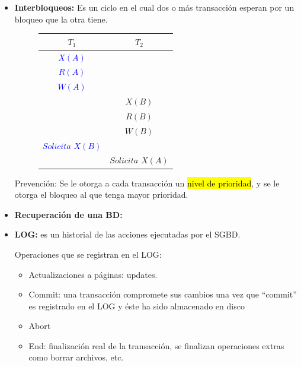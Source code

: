 \documentclass{templateNote}
\begin{document}
\begin{itemize}
    \item \textbf{Interbloqueos:} Es un ciclo en el cual dos o más transacción esperan por un bloqueo que la otra tiene.
    
    \begin{figure}[H]
        \centering
        \begin{tabular}{|c|c|}
            \hline
            \textbf{$T_1$} & \textbf{$T_2$} \\ \hline
            \textcolor{blue}{$X(A)$} & \\
            \textcolor{blue}{$R(A)$} & \\
            \textcolor{blue}{$W(A)$} & \\
            & \textcolor{green!80!black}{$X(B)$} \\
            & \textcolor{green!80!black}{$R(B)$} \\
            & \textcolor{green!80!black}{$W(B)$} \\
            \textcolor{blue}{\textit{$Solicita$  ${X(B)}$}} & \\
            & \textcolor{green!80!black}{\textit{$Solicita$ ${X(A)}$}} \\ \hline
        \end{tabular}
    \end{figure}

    Prevención: Se le otorga a cada transacción un \hl{nivel de prioridad}, y se le otorga el bloqueo al que tenga mayor prioridad.

    \newpage
    \item \textbf{Recuperación de una BD:} 
    
    \item \textbf{LOG:} es un historial de las acciones ejecutadas por el SGBD.
    
    Operaciones que se registran en el LOG:
    \begin{itemize}
        \item Actualizaciones a páginas: updates.
        
        \item Commit: una transacción compromete sus cambios una vez que “commit” es registrado en el LOG y éste ha sido almacenado en disco
        
        \item Abort
        
        \item End: finalización real de la transacción, se finalizan operaciones extras como borrar archivos, etc.
        

\end{itemize}
\end{itemize}
\end{document}
